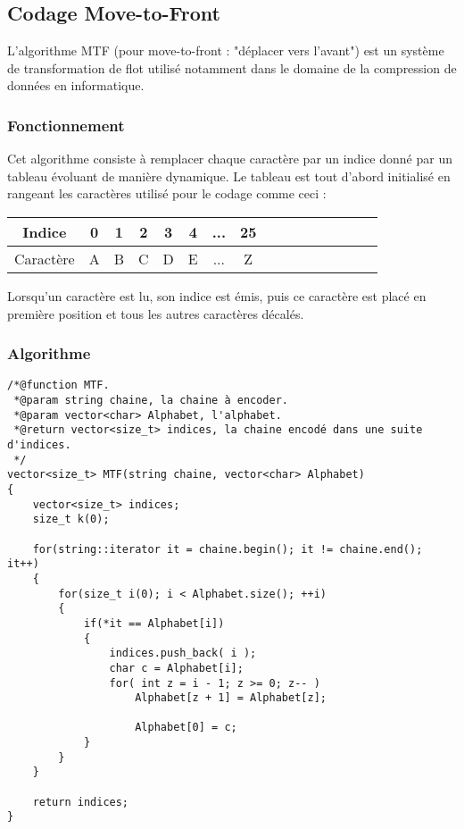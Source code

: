 \subsection{Codage Move-to-Front}

\par L'algorithme MTF (pour move-to-front : "déplacer vers l'avant") est un système de transformation de flot utilisé notamment dans le domaine de la compression de données en informatique. 

\subsubsection{Fonctionnement}
\par Cet algorithme consiste à remplacer chaque caractère par un indice donné par un tableau évoluant de manière dynamique. 
Le tableau est tout d'abord initialisé en rangeant les caractères utilisé pour le codage comme ceci : \\

\begin{tabular}{|c|c|c|c|c|c|c|c|c|c|c|c|c|c|c|c|}
    \hline
    Indice & 0 & 1 & 2 & 3 & 4 & ... & 25\\
    \hline
    Caractère & A & B & C & D & E & ... & Z\\
    \hline
\end{tabular}

\par Lorsqu'un caractère est lu, son indice est émis, puis ce caractère est placé en première position et tous les autres caractères décalés.

\subsubsection{Algorithme}
\begin{verbatim}
/*@function MTF.
 *@param string chaine, la chaine à encoder.
 *@param vector<char> Alphabet, l'alphabet.
 *@return vector<size_t> indices, la chaine encodé dans une suite d'indices.
 */
vector<size_t> MTF(string chaine, vector<char> Alphabet)
{
	vector<size_t> indices;
	size_t k(0);

	for(string::iterator it = chaine.begin(); it != chaine.end(); it++)
	{
		for(size_t i(0); i < Alphabet.size(); ++i)
		{
			if(*it == Alphabet[i])
			{
				indices.push_back( i );
				char c = Alphabet[i];
				for( int z = i - 1; z >= 0; z-- )
	    			Alphabet[z + 1] = Alphabet[z];
 
        			Alphabet[0] = c;
			}
		}
	}
	
	return indices;
}
\end{verbatim}


